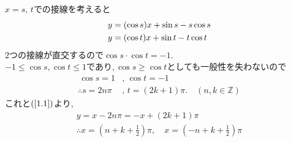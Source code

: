 \documentclass[main]{subfiles}
\begin{document}
\begin{answer}
$x=s, \, t$での接線を考えると
    \begin{align}
    &y=(\cos s)x+\sin s - s \cos s\notag\\
    &y=(\cos t)x+\sin t - t \cos t \label{1.1}%
\end{align}
$2$つの接線が直交するので$\cos s \cdot \cos t = -1.$ \\
$-1 \le \cos s, \cos t \le 1$であり,$\, \cos s \ge \cos t$としても一般性を失わないので
\begin{align*}
\, \cos s= 1 &, \, \cos t =-1\\
\therefore s=2n\pi &, \,  t=(2k+1)\pi. \quad (n, k \in \mathbb{Z} )
\end{align*}
これと$(\ref{1.1})$より,
\begin{align*}
y = x-2n\pi = -x+(2k+1)\pi \\
\therefore x=\left( n+k+\frac{1}{2} \right)\pi , \quad x=\left( -n+k+\frac{1}{2} \right)\pi
\end{align*}

\end{answer}
 
\end{document}
